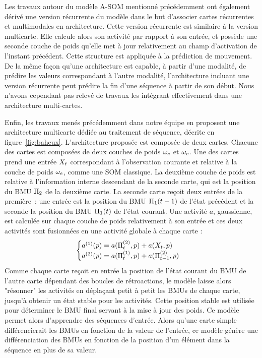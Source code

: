 \documentclass[../main]{subfiles}
\begin{document}
{Les travaux autour du modèle A-SOM mentionné précédemment ont également dérivé une version récurrente du modèle \cite{Buonamente2015DiscriminatingAS} dans le but d'associer cartes récurrentes et multimodales en architecture.
Cette version récurrente est similaire à la version multicarte. Elle calcule alors son activité par rapport à son entrée, et possède une seconde couche de poids qu'elle met à jour relativement au champ d'activation de l'instant précédent.
Cette structure est appliquée à la prédiction de mouvement. De la même façon qu'une architecture est capable, à partir d'une modalité, de prédire les valeurs correspondant à l'autre modalité, l'architecture incluant une version récurrente peut prédire la fin d'une séquence à partir de son début.
Nous n'avons cependant pas relevé de travaux les intégrant effectivement dans une architecture multi-cartes.

Enfin, les travaux menés précédemment dans notre équipe en \cite{baheux_towards_2014} proposent une architecture multicarte dédiée au traitement de séquence, décrite en figure~\ref{fig:baheux}.
L'architecture proposée est composée de deux cartes. Chacune des cartes est composées de deux couches de poids $\omega_e$ et $\omega_c$. Une des cartes prend une entrée $X_t$ correspondant à l'observation courante et relative à la couche de poids $\omega_e$, comme une SOM classique. 
La deuxième couche de poids est relative à l'information interne descendant de la seconde carte, qui est la position du BMU $\Pi_2$ de la deuxième carte. 
La seconde carte reçoit deux entrées de la première~: une entrée est la position du BMU $\Pi_1(t-1)$ de l'état précédent et la seconde la position du BMU $\Pi_1(t)$ de l'état courant. 
Une activité $a$, gaussienne, est calculée sur chaque couche de poids relativement à son entrée et ces deux activités sont fusionnées en une activité globale à chaque carte :
$$
\begin{cases}
    a^{({1})}(p) = a(\Pi^{({2})}_t,p) + a(X_t,p)\\
    a^{({2})}(p) = a(\Pi^{({1})}_t,p) + a(\Pi^{({2})}_{t-1},p)
\end{cases} 
$$
Comme chaque carte reçoit en entrée la position de l'état courant du BMU de l'autre carte dépendant des boucles de rétroactions, le modèle laisse alors "résonner" les activités en déplaçant petit à petit les BMUs de chaque carte, jusqu'à obtenir un état stable pour les activités. Cette position stable est utilisée pour déterminer le BMU final servant à la mise à jour des poids.
Ce modèle permet alors d'apprendre des séquences d'entrée. Alors qu'une carte simple différencierait les BMUs en fonction de la valeur de l'entrée, ce modèle génère une différenciation des BMUs en fonction de la position d'un élément dans la séquence en plus de sa valeur. 

}
\end{document}
